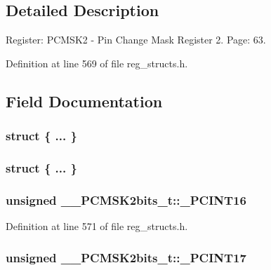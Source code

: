 \subsection{Detailed Description}
Register\+: P\+C\+M\+S\+K2 -\/ Pin Change Mask Register 2. Page\+: 63. 

Definition at line 569 of file reg\+\_\+structs.\+h.



\subsection{Field Documentation}
\hypertarget{union_____p_c_m_s_k2bits__t_a52607bcc2b9ec4f7529a3e974c06f0dc}{\subsubsection[{"@137}]{\setlength{\rightskip}{0pt plus 5cm}struct \{ ... \} }}\label{union_____p_c_m_s_k2bits__t_a52607bcc2b9ec4f7529a3e974c06f0dc}
\hypertarget{union_____p_c_m_s_k2bits__t_ae36a004ba0a2edc60f683582e75dd948}{\subsubsection[{"@139}]{\setlength{\rightskip}{0pt plus 5cm}struct \{ ... \} }}\label{union_____p_c_m_s_k2bits__t_ae36a004ba0a2edc60f683582e75dd948}
\hypertarget{union_____p_c_m_s_k2bits__t_ae23198008dc481599ceb3073588f87b7}{
\subsubsection[{\+\_\+\+P\+C\+I\+N\+T16}]{\setlength{\rightskip}{0pt plus 5cm}unsigned \+\_\+\+\_\+\+P\+C\+M\+S\+K2bits\+\_\+t\+::\+\_\+\+P\+C\+I\+N\+T16}}\label{union_____p_c_m_s_k2bits__t_ae23198008dc481599ceb3073588f87b7}


Definition at line 571 of file reg\+\_\+structs.\+h.

\hypertarget{union_____p_c_m_s_k2bits__t_ab2ef255881ab41b23a900563cb206628}{
\subsubsection[{\+\_\+\+P\+C\+I\+N\+T17}]{\setlength{\rightskip}{0pt plus 5cm}unsigned \+\_\+\+\_\+\+P\+C\+M\+S\+K2bits\+\_\+t\+::\+\_\+\+P\+C\+I\+N\+T17}}\label{union_____p_c_m_s_k2bits__t_ab2ef255881ab41b23a900563cb206628}


